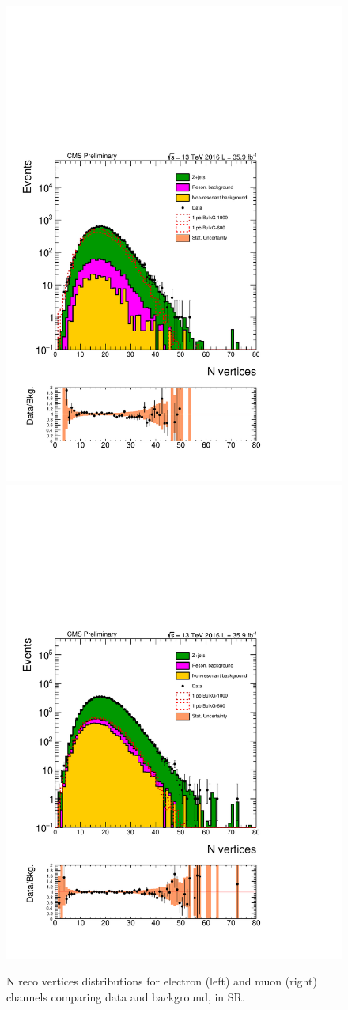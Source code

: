 \begin{figure}[htbp!]
\centering
\includegraphics[width=0.46\linewidth, page=2]{figures/ReMiniSummer16_DT_PhReMiniMCRcFixXsec_GMCPhPtWt_SRdPhiGT0p5_puWeightsummer16_muoneg_gjet_metfilter_unblind_el_log_1pb.pdf}
\includegraphics[width=0.46\linewidth, page=2]{figures/ReMiniSummer16_DT_PhReMiniMCRcFixXsec_GMCPhPtWt_SRdPhiGT0p5_puWeightsummer16_muoneg_gjet_metfilter_unblind_mu_log_1pb.pdf}
\caption{N reco vertices distributions for electron (left) and muon (right)
channels comparing data and background, in SR.}
\label{fit:SR_gjet_nvtx}
\end{figure}


